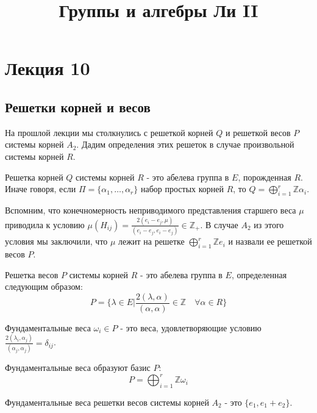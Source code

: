 \documentclass[a4article]{article}
\title{Группы и алгебры Ли II}
\author{}
\date{}
\begin{document}
\maketitle

\section*{Лекция 10}

\subsection*{Решетки корней и весов}
На прошлой лекции мы столкнулись с решеткой корней $Q$ и решеткой весов $P$ системы корней $A_2$. Дадим определения этих решеток в случае произвольной системы корней $R$.

\begin{definition}
    Решетка корней $Q$ системы корней $R$ - это абелева группа в $E$, порожденная $R$. Иначе говоря, если $\Pi = \{\alpha_1, \ldots, \alpha_r\}$ набор простых корней $R$, то $Q = \bigoplus_{i=1}^{r}\mathbb{Z}\alpha_i$.
\end{definition}
Вспомним, что конечномерность неприводимого представления старшего веса $\mu$ приводила к условию $\mu(H_{ij})=\frac{2(e_i-e_j, \mu)}{(e_i-e_j, e_i-e_j)} \in \mathbb{Z}_+$. В случае $A_2$ из этого условия мы заключили, что $\mu$ лежит на решетке $\bigoplus_{i=1}^{r}\mathbb{Z}e_i$ и назвали ее решеткой весов $P$. 
\begin{definition}
    Решетка весов $P$ системы корней $R$ - это абелева группа в $E$, определенная следующим образом:
    \begin{equation}
        P = \{\lambda \in E| \frac{2(\lambda, \alpha)}{(\alpha, \alpha)} \in \mathbb{Z} \quad \forall \alpha \in R\}
    \end{equation}
\end{definition}
\begin{definition}
    Фундаментальные веса $\omega_i \in P$ - это веса, удовлетворяющие условию $\frac{2(\lambda_i, \alpha_j)}{(\alpha_j, \alpha_j)}=\delta_{ij}$.
\end{definition}
Фундаментальные веса образуют базис $P$:
\begin{equation}
    P = \bigoplus_{i=1}^{r}\mathbb{Z}\omega_i
\end{equation}
\begin{example}
    Фундаментальные веса решетки весов системы корней $A_2$ - это $\{e_1, e_1+e_2\}$.
\end{example}
\end{document}
